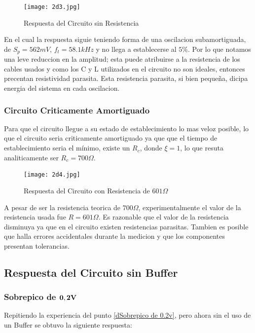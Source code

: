 \begin{figure}[h!]
\centering
\texttt{[image: 2d3.jpg]}
\caption{Respuesta del Circuito sin Resistencia} 	
\label{fig:LRC2d3}
\end{figure}

\pagebreak

En el cual la respuesta siguie teniendo forma de una oscilacion subamortiguada, de $S_p = 562mV$, $f_t = 58.1kHz$ y no llega a establecerse al $5\%$. Por lo que notamos una leve reduccion en la amplitud; esta puede atribuirse a la resistencia de los cables usados y como los C y L utilizados en el circuito no son ideales, entonces precentan resistividad  parasita. Esta resistencia  parasita, si bien pequeña, dicipa energia del sistema en cada oscilacion.

\subsubsection{Circuito Criticamente Amortiguado}

Para que el circuito llegue a su estado de establecimiento lo mas veloz posible, lo que el circuito seria criticamente amortiguado ya que que el tiempo de establecimiento seria el mínimo, existe un $R_c$, donde $\xi = 1$, lo que resuta analiticamente ser $R_c = 700\Omega$. 

\begin{figure}[h!]
\centering
\texttt{[image: 2d4.jpg]}
\caption{Respuesta del Circuito con Resistencia de $601\Omega$} 	
\label{fig:LRC2d4}
\end{figure}

A pesar de ser la resistencia teorica de $700\Omega$, experimentalmente el valor de la resistencia usada fue $R = 601\Omega$. Es razonable que el valor de la resistencia disminuya ya que en el circuito existen resistencias parasitas. Tambien es posible que halla errores accidentales durante la medicion y que los componentes presentan tolerancias.

\subsection{Respuesta del Circuito sin Buffer}

\subsubsection{Sobrepico de $\bold{0,2V}$} 

Repitiendo la experiencia del punto \ref{dSobrepico de 0.2v}, pero ahora sin el uso de un Buffer se obtuvo la siguiente respuesta:

